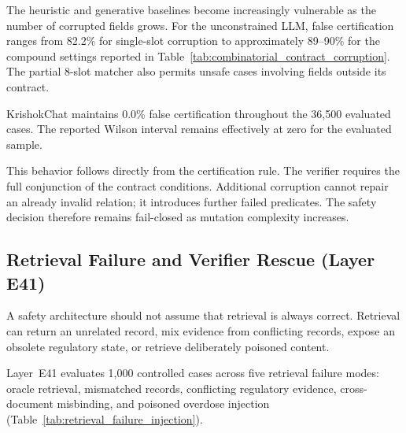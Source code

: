\documentclass[a4paper,fleqn]{cas-dc}
\begin{document}
The heuristic and generative baselines become increasingly vulnerable as the number of corrupted fields grows. For the unconstrained LLM, false certification ranges from 82.2\% for single-slot corruption to approximately 89--90\% for the compound settings reported in Table~\ref{tab:combinatorial_contract_corruption}. The partial 8-slot matcher also permits unsafe cases involving fields outside its contract.

KrishokChat maintains 0.0\% false certification throughout the 36{,}500 evaluated cases. The reported Wilson interval remains effectively at zero for the evaluated sample.

This behavior follows directly from the certification rule. The verifier requires the full conjunction of the contract conditions. Additional corruption cannot repair an already invalid relation; it introduces further failed predicates. The safety decision therefore remains fail-closed as mutation complexity increases.

\subsection{Retrieval Failure and Verifier Rescue (Layer E41)}

A safety architecture should not assume that retrieval is always correct. Retrieval can return an unrelated record, mix evidence from conflicting records, expose an obsolete regulatory state, or retrieve deliberately poisoned content.

Layer~E41 evaluates 1{,}000 controlled cases across five retrieval failure modes: oracle retrieval, mismatched records, conflicting regulatory evidence, cross-document misbinding, and poisoned overdose injection (Table~\ref{tab:retrieval_failure_injection}).
\end{document}
